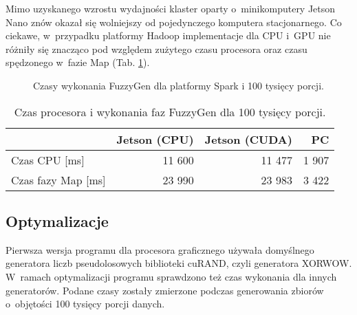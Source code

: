 Mimo uzyskanego wzrostu wydajności klaster oparty o~minikomputery Jetson Nano znów okazał się
wolniejszy od pojedynczego komputera stacjonarnego.
Co ciekawe, w~przypadku platformy Hadoop implementacje dla CPU i~GPU nie różniły się znacząco pod
względem zużytego czasu procesora oraz czasu spędzonego w~fazie Map (Tab. \ref{tab:fuzzygen:mapreduce:100K}).

\begin{figure}[h!]
    \centering
    \caption{Czasy wykonania FuzzyGen dla platformy Spark i 100 tysięcy porcji.}
    \label{fig:fuzzygen:spark:100K}
\end{figure}

\begin{table}[h]
    \centering
    \caption{Czas procesora i wykonania faz FuzzyGen dla 100 tysięcy porcji.}
    \begin{tabular}{ | l | r | r | r | }
        \hline
                           & Jetson (CPU) & Jetson (CUDA) & PC   \\
        \hline
        Czas CPU [ms]      & 11 600        & 11 477         & 1 907 \\
        Czas fazy Map [ms] & 23 990        & 23 983         & 3 422 \\
        \hline
    \end{tabular}
    \label{tab:fuzzygen:mapreduce:100K}
\end{table}

\subsection*{Optymalizacje}

Pierwsza wersja programu dla procesora graficznego używała domyślnego generatora liczb pseudolosowych
biblioteki cuRAND, czyli generatora XORWOW. W~ramach optymalizacji programu sprawdzono też czas wykonania dla 
innych generatorów. Podane czasy zostały zmierzone podczas generowania zbiorów o~objętości 100 tysięcy porcji danych.

